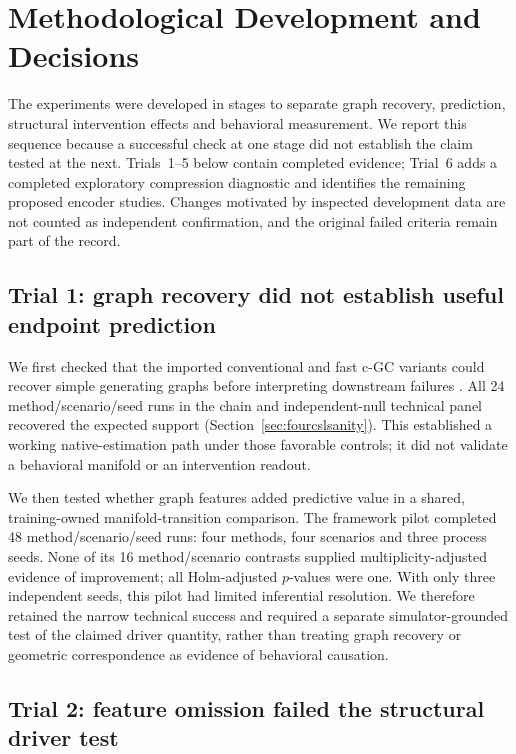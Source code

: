 \section{Methodological Development and Decisions}
\label{sec:methodologicaldevelopment}

The experiments were developed in stages to separate graph recovery,
prediction, structural intervention effects and behavioral measurement. We
report this sequence because a successful check at one stage did not establish
the claim tested at the next. Trials~1--5 below contain completed evidence;
Trial~6 adds a completed exploratory compression diagnostic and identifies the
remaining proposed encoder studies. Changes motivated by inspected development
data are not counted as independent confirmation, and the original failed
criteria remain part of the record.

\subsection{Trial 1: graph recovery did not establish useful endpoint prediction}

We first checked that the imported conventional and fast c-GC variants could
recover simple generating graphs before interpreting downstream failures
\citep{adedayo2025cgc,adedayo2026fastcgc}. All 24 method/scenario/seed runs in the
chain and independent-null technical panel recovered the expected support
(Section~\ref{sec:fourcslsanity}). This established a working native-estimation
path under those favorable controls; it did not validate a behavioral manifold
or an intervention readout.

We then tested whether graph features added predictive value in a shared,
training-owned manifold-transition comparison. The framework pilot completed
48 method/scenario/seed runs: four methods, four scenarios and three process
seeds. None of its 16 method/scenario contrasts supplied multiplicity-adjusted
evidence of improvement; all Holm-adjusted $p$-values were one. With only three
independent seeds, this pilot had limited inferential resolution. We therefore
retained the narrow technical success and required a separate simulator-grounded
test of the claimed driver quantity, rather than treating graph recovery or
geometric correspondence as evidence of behavioral causation.

\subsection{Trial 2: feature omission failed the structural driver test}

